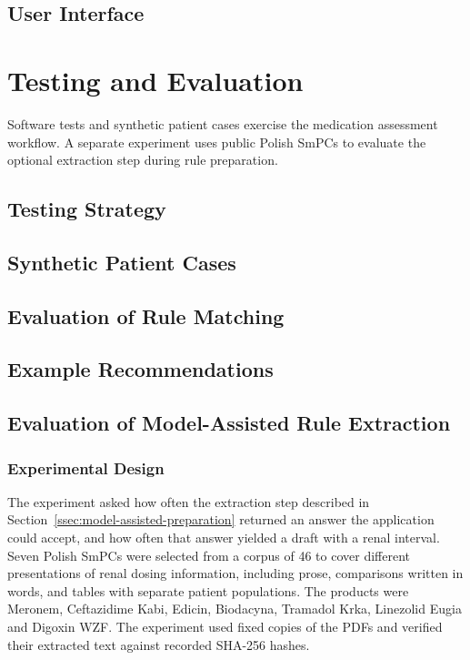 \documentclass[12pt,a4paper,twoside]{book}
\begin{document}
\section{User Interface}\label{sec:user-interface}



\chapter{Testing and Evaluation}\label{ch:testing}

Software tests and synthetic patient cases exercise the medication assessment workflow.
A separate experiment uses public Polish SmPCs to evaluate the optional extraction step during rule preparation.

\section{Testing Strategy}\label{sec:testing-strategy}
\section{Synthetic Patient Cases}\label{sec:synthetic-patient-cases}
\section{Evaluation of Rule Matching}\label{sec:rule-matching-evaluation}
\section{Example Recommendations}\label{sec:example-recommendations}

\section{Evaluation of Model-Assisted Rule Extraction}
\label{sec:extraction-evaluation}

\subsection{Experimental Design}
\label{ssec:extraction-methods}

The experiment asked how often the extraction step described in Section~\ref{ssec:model-assisted-preparation} returned an answer the application could accept, and how often that answer yielded a draft with a renal interval.
Seven Polish SmPCs were selected from a corpus of 46 to cover different presentations of renal dosing information, including prose, comparisons written in words, and tables with separate patient populations.
The products were Meronem, Ceftazidime Kabi, Edicin, Biodacyna, Tramadol Krka, Linezolid Eugia and Digoxin WZF.
The experiment used fixed copies of the PDFs and verified their extracted text against recorded SHA-256 hashes.
\end{document}
